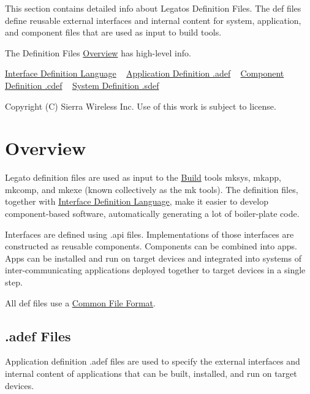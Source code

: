 This section contains detailed info about Legato\textquotesingle{}s Definition Files. The {\ttfamily def} files define reusable external interfaces and internal content for system, application, and component files that are used as input to build tools.

The Definition Files\textquotesingle{} \hyperlink{defFilesOverview}{Overview} has high-\/level info.



 \hyperlink{interfaceDefLang}{Interface Definition Language} ~\newline
 \hyperlink{defFilesAdef}{Application Definition .adef} ~\newline
 \hyperlink{defFilesCdef}{Component Definition .cdef} ~\newline
 \hyperlink{defFilesSdef}{System Definition .sdef}





Copyright (C) Sierra Wireless Inc. Use of this work is subject to license. \hypertarget{defFilesOverview}{}\section{Overview}\label{defFilesOverview}
Legato definition files are used as input to the \hyperlink{buildTools}{Build} tools {\ttfamily mksys}, {\ttfamily mkapp}, {\ttfamily mkcomp}, and {\ttfamily mkexe} (known collectively as the mk tools). The definition files, together with \hyperlink{interfaceDefLang}{Interface Definition Language}, make it easier to develop component-\/based software, automatically generating a lot of boiler-\/plate code.

Interfaces are defined using {\ttfamily .api} files. Implementations of those interfaces are constructed as reusable components. Components can be combined into apps. Apps can be installed and run on target devices and integrated into systems of inter-\/communicating applications deployed together to target devices in a single step.

All def files use a \hyperlink{defFilesFormat}{Common File Format}.\hypertarget{def_files_overview_defFilesOverview_adef}{}\subsection{.\+adef Files}\label{def_files_overview_defFilesOverview_adef}
Application definition {\ttfamily }.adef files are used to specify the external interfaces and internal content of applications that can be built, installed, and run on target devices.

